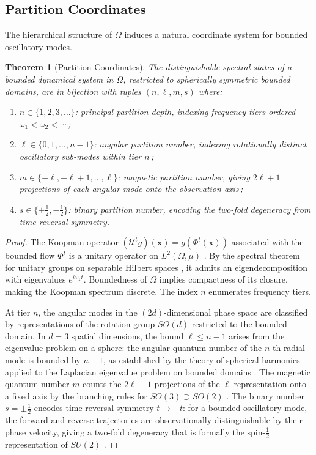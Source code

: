 \documentclass[11pt,twocolumn,a4paper]{article}
\newtheorem{theorem}{Theorem}[section]
\theoremstyle{definition}
\theoremstyle{remark}
\begin{document}
\subsection{Partition Coordinates}

The hierarchical structure of $\Omega$ induces a natural coordinate system
for bounded oscillatory modes.

\begin{theorem}[Partition Coordinates]
\label{thm:coords}
The distinguishable spectral states of a bounded dynamical system in $\Omega$,
restricted to spherically symmetric bounded domains, are in bijection with
tuples $(n, \ell, m, s)$ where:
\begin{enumerate}[nosep,label=(\roman*)]
  \item $n \in \{1, 2, 3, \ldots\}$: principal partition depth, indexing
    frequency tiers ordered $\omega_1 < \omega_2 < \cdots$\,;
  \item $\ell \in \{0, 1, \ldots, n-1\}$: angular partition number,
    indexing rotationally distinct oscillatory sub-modes within tier $n$\,;
  \item $m \in \{-\ell, -\ell+1, \ldots, \ell\}$: magnetic partition number,
    giving $2\ell+1$ projections of each angular mode onto the observation
    axis\,;
  \item $s \in \{+\tfrac{1}{2}, -\tfrac{1}{2}\}$: binary partition number,
    encoding the two-fold degeneracy from time-reversal symmetry.
\end{enumerate}
\end{theorem}

\begin{proof}
The Koopman operator $(\mathcal{U}^t g)(\mathbf{x}) = g(\Phi^t(\mathbf{x}))$
associated with the bounded flow $\Phi^t$ is a unitary operator on
$L^2(\Omega, \mu)$ \citep{koopman1931}. By the spectral theorem for unitary
groups on separable Hilbert spaces \citep{vonneumann1932}, it admits an
eigendecomposition with eigenvalues $e^{i\omega_k t}$. Boundedness of $\Omega$
implies compactness of its closure, making the Koopman spectrum discrete.
The index $n$ enumerates frequency tiers.

At tier $n$, the angular modes in the $(2d)$-dimensional phase space are
classified by representations of the rotation group $SO(d)$ restricted to the
bounded domain. In $d=3$ spatial dimensions, the bound $\ell \leq n-1$ arises
from the eigenvalue problem on a sphere: the angular quantum number of
the $n$-th radial mode is bounded by $n-1$, as established by the
theory of spherical harmonics applied to the Laplacian eigenvalue problem
on bounded domains \citep{courant1953}. The magnetic quantum number $m$
counts the $2\ell+1$ projections of the $\ell$-representation onto a fixed
axis by the branching rules for $SO(3) \supset SO(2)$ \citep{weyl1946}.
The binary number $s = \pm\frac{1}{2}$ encodes time-reversal symmetry
$t \to -t$: for a bounded oscillatory mode, the forward and reverse
trajectories are observationally distinguishable by their phase velocity,
giving a two-fold degeneracy that is formally the spin-$\tfrac{1}{2}$
representation of $SU(2)$ \citep{sakurai2017}.
\end{proof}
\end{document}
